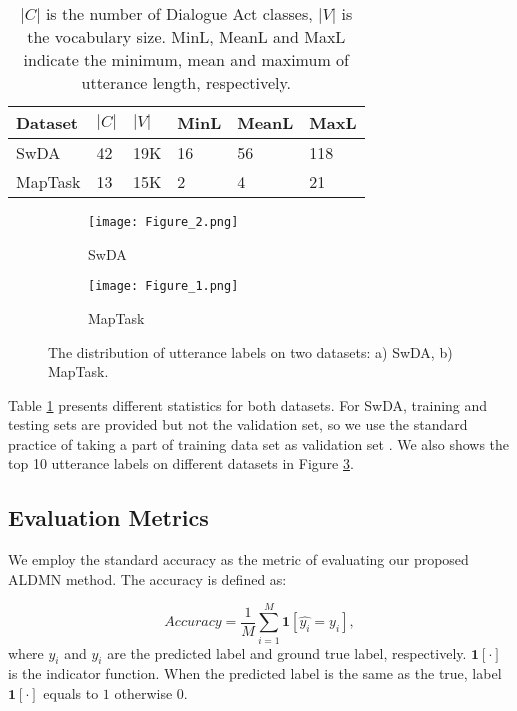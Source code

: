 \documentclass[conference]{IEEEtran}
\begin{document}
	\begin{table}[!t]
		\centering
		\begin{tabular}{|l|l|l|l|l|l|}
			\hline
			Dataset &$|C|$&$|V|$&MinL&MeanL&MaxL\\
			\hline
			SwDA&42&19K&16&56&118\\
			MapTask&13&15K&2&4&21\\
			\hline
		\end{tabular}
		\caption{$|C|$ is the number of Dialogue Act classes, $|V|$ is the vocabulary size. MinL, MeanL and MaxL indicate the minimum, mean and maximum of utterance length, respectively.}
		\label{table:stastic}
	\end{table}
	
	\begin{figure}[!t]
		\centering
		\begin{subfigure}[b]{0.49\textwidth}
			\texttt{[image: Figure\_2.png]}
			\caption{SwDA}
			\label{fig_varadv_swda}
		\end{subfigure}
		\begin{subfigure}[b]{0.49\textwidth}
			\texttt{[image: Figure\_1.png]}
			\caption{MapTask}
			\label{fig_varadv_maptaskr}
		\end{subfigure}
		\caption{The distribution of utterance labels on two datasets: a) SwDA, b) MapTask.}
		\label{fig_length_distribution}
		\vspace{-0.8em}
	\end{figure}
	
	
	Table \ref{table:stastic} presents different statistics for both datasets. For SwDA, training and testing sets are provided but not the validation set, so we use the standard practice of taking a part of training data set as validation set \cite{lee2016sequential}. We also shows the top 10 utterance labels on different datasets in Figure \ref{fig_length_distribution}.
	
	\subsection{Evaluation Metrics}
	We employ the standard accuracy as the metric of evaluating our proposed ALDMN method. The accuracy is defined as: 
	
	\begin{equation}
	Accuracy = \frac{1}{M} \sum_{i=1}^{M}\textbf{1}[\hat{y_i} = y_i],
	\end{equation}
	where $\hat{y_i}$ and $y_i$ are the predicted label and ground true label, respectively. $\textbf{1}[\cdot]$ is the indicator function. When the predicted label is the same as the true, label $\textbf{1}[\cdot]$ equals to $1$ otherwise $0$.
	
\end{document}
